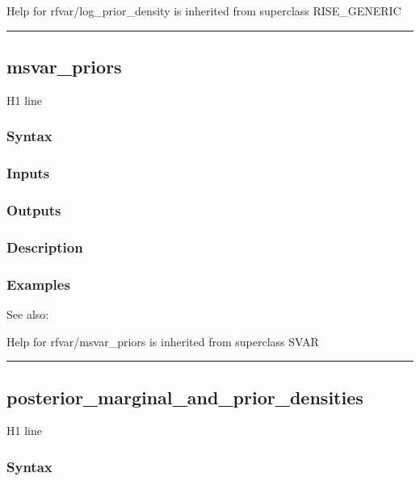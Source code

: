 \documentclass[letterpaper,10pt,english]{sphinxmanual}
\begin{document}
Help for rfvar/log\_prior\_density is inherited from superclass RISE\_GENERIC


\bigskip\hrule{}\bigskip



\subsection{msvar\_priors}
\label{classes/models/@rfvar/rfvar:id72}\label{classes/models/@rfvar/rfvar:msvar-priors}
H1 line


\subsubsection{Syntax}
\label{classes/models/@rfvar/rfvar:id73}

\subsubsection{Inputs}
\label{classes/models/@rfvar/rfvar:id74}

\subsubsection{Outputs}
\label{classes/models/@rfvar/rfvar:id75}

\subsubsection{Description}
\label{classes/models/@rfvar/rfvar:id76}

\subsubsection{Examples}
\label{classes/models/@rfvar/rfvar:id77}
See also:

Help for rfvar/msvar\_priors is inherited from superclass SVAR


\bigskip\hrule{}\bigskip



\subsection{posterior\_marginal\_and\_prior\_densities}
\label{classes/models/@rfvar/rfvar:id78}\label{classes/models/@rfvar/rfvar:posterior-marginal-and-prior-densities}
H1 line


\subsubsection{Syntax}
\label{classes/models/@rfvar/rfvar:id79}
\end{document}
